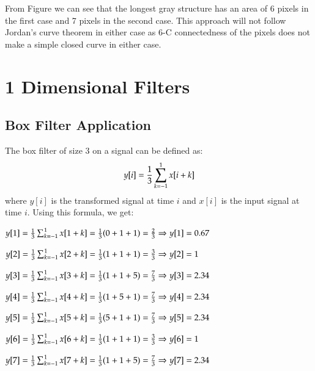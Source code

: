 \documentclass[a4paper,11pt]{article}
\begin{document}
\newline
From Figure we can see that the longest gray structure has an area of 6 pixels in the first case and 7 pixels in the second case.
\newline
This approach will not follow Jordan's curve theorem in either case as 6-C connectedness of the pixels does not make a simple closed curve in either case.





\section{1 Dimensional Filters}
\subsection{Box Filter Application}

The box filter of size 3 on a signal can be defined as:
$${y[i] = \frac{1}{3} \large\sum _{k=-1}^{1} x[i+k]}$$
\newline
where $y[i]$ is the transformed signal at time $i$ and $x[i]$ is the input signal at time $i$.
\newline
Using this formula, we get:\newline

${y[1] = \frac{1}{3} \large\sum _{k=-1}^{1} x[1+k] = \frac{1}{3} (0+1+1) = \frac{2}{3} \Rightarrow y[1]=  0.67 }$\newline

${ y[2] = \frac{1}{3} \large\sum _{k=-1}^{1} x[2+k] = \frac{1}{3} (1+1+1) = \frac{3}{3} \Rightarrow y[2]=  1 }$ \newline

${ y[3] = \frac{1}{3} \large\sum _{k=-1}^{1} x[3+k] = \frac{1}{3} (1+1+5) = \frac{7}{3} \Rightarrow y[3]=  2.34 }$ \newline

${ y[4] = \frac{1}{3} \large\sum _{k=-1}^{1} x[4+k] = \frac{1}{3} (1+5+1) = \frac{7}{3} \Rightarrow y[4]=  2.34 }$ \newline

${ y[5] = \frac{1}{3} \large\sum _{k=-1}^{1} x[5+k] = \frac{1}{3} (5+1+1) = \frac{7}{3} \Rightarrow y[5]=  2.34 }$ \newline

${ y[6] = \frac{1}{3} \large\sum _{k=-1}^{1} x[6+k] = \frac{1}{3} (1+1+1) = \frac{3}{3} \Rightarrow y[6]=  1 }$ \newline

${ y[7] = \frac{1}{3} \large\sum _{k=-1}^{1} x[7+k] = \frac{1}{3} (1+1+5) = \frac{7}{3} \Rightarrow y[7]=  2.34 }$ \newline
\end{document}
